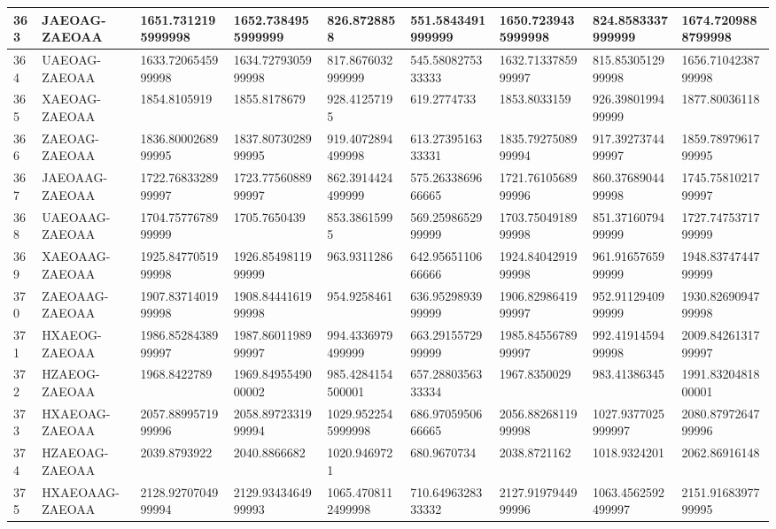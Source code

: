 {\begin{longtable}{|l|l|l|l|l|l|l|l|l|}
        363 & JAEOAG-ZAEOAA & 1651.7312195999998 & 1652.7384955999999 & 826.8728858 & 551.5843491999999 & 1650.7239435999998 & 824.8583337999999 & 1674.7209888799998 \\ \hline
        364 & UAEOAG-ZAEOAA & 1633.7206545999998 & 1634.7279305999998 & 817.8676032999999 & 545.5808275333333 & 1632.7133785999997 & 815.8530512999998 & 1656.7104238799998 \\ \hline
        365 & XAEOAG-ZAEOAA & 1854.8105919 & 1855.8178679 & 928.41257195 & 619.2774733 & 1853.8033159 & 926.3980199499999 & 1877.80036118 \\ \hline
        366 & ZAEOAG-ZAEOAA & 1836.8000268999995 & 1837.8073028999995 & 919.4072894499998 & 613.2739516333331 & 1835.7927508999994 & 917.3927374499997 & 1859.7897961799995 \\ \hline
        367 & JAEOAAG-ZAEOAA & 1722.7683328999997 & 1723.7756088999997 & 862.3914424499999 & 575.2633869666665 & 1721.7610568999996 & 860.3768904499998 & 1745.7581021799997 \\ \hline
        368 & UAEOAAG-ZAEOAA & 1704.7577678999999 & 1705.7650439 & 853.38615995 & 569.2598652999999 & 1703.7504918999998 & 851.3716079499999 & 1727.7475371799999 \\ \hline
        369 & XAEOAAG-ZAEOAA & 1925.8477051999998 & 1926.8549811999999 & 963.9311286 & 642.9565110666666 & 1924.8404291999998 & 961.9165765999999 & 1948.8374744799999 \\ \hline
        370 & ZAEOAAG-ZAEOAA & 1907.8371401999998 & 1908.8444161999998 & 954.9258461 & 636.9529893999999 & 1906.8298641999997 & 952.9112940999999 & 1930.8269094799998 \\ \hline
        371 & HXAEOG-ZAEOAA & 1986.8528438999997 & 1987.8601198999997 & 994.4336979499999 & 663.2915572999999 & 1985.8455678999997 & 992.4191459499998 & 2009.8426131799997 \\ \hline
        372 & HZAEOG-ZAEOAA & 1968.8422789 & 1969.8495549000002 & 985.4284154500001 & 657.2880356333334 & 1967.8350029 & 983.41386345 & 1991.8320481800001 \\ \hline
        373 & HXAEOAG-ZAEOAA & 2057.8899571999996 & 2058.8972331999994 & 1029.9522545999998 & 686.9705950666665 & 2056.8826811999998 & 1027.9377025999997 & 2080.8797264799996 \\ \hline
        374 & HZAEOAG-ZAEOAA & 2039.8793922 & 2040.8866682 & 1020.9469721 & 680.9670734 & 2038.8721162 & 1018.9324201 & 2062.86916148 \\ \hline
        375 & HXAEOAAG-ZAEOAA & 2128.9270704999994 & 2129.9343464999993 & 1065.4708112499998 & 710.6496328333332 & 2127.9197944999996 & 1063.4562592499997 & 2151.9168397799995 \\ \hline

\end{longtable}}
